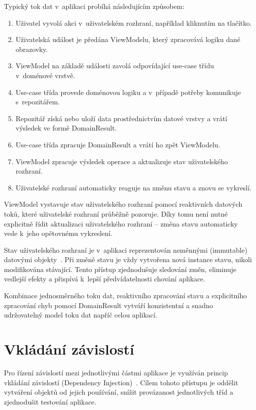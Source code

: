 Typický tok dat v~aplikaci probíhá následujícím způsobem:
\begin{enumerate}
    \item Uživatel vyvolá akci v~uživatelském rozhraní, například kliknutím na tlačítko.
    \item Uživatelská událost je předána ViewModelu, který zpracovává logiku dané obrazovky.
    \item ViewModel na základě události zavolá odpovídající use-case třídu v~doménové vrstvě.
    \item Use-case třída provede doménovou logiku a v~případě potřeby komunikuje s~repozitářem.
    \item Repozitář získá nebo uloží data prostřednictvím datové vrstvy a vrátí výsledek ve formě DomainResult.
    \item Use-case třída zpracuje DomainResult a vrátí ho zpět ViewModelu.
    \item ViewModel zpracuje výsledek operace a aktualizuje stav uživatelského rozhraní.
    \item Uživatelské rozhraní automaticky reaguje na změnu stavu a znovu se vykreslí.
\end{enumerate}

ViewModel vystavuje stav uživatelského rozhraní pomocí reaktivních datových toků, které uživatelské rozhraní průběžně pozoruje.
Díky tomu není nutné explicitně řídit aktualizaci uživatelského rozhraní -- změna stavu automaticky vede k~jeho opětovnému vykreslení.

Stav uživatelského rozhraní je v~aplikaci reprezentován neměnnými (immutable) datovými objekty~\parencite{compose_ui_architecture}.
Při změně stavu je vždy vytvořena nová instance stavu, nikoli modifikována stávající.
Tento přístup zjednodušuje sledování změn, eliminuje vedlejší efekty a přispívá k~lepší předvídatelnosti chování aplikace.

Kombinace jednosměrného toku dat, reaktivního zpracování stavu a explicitního zpracování chyb pomocí DomainResult vytváří konzistentní a snadno udržovatelný model toku dat napříč celou aplikací.


\section{Vkládání závislostí}\label{sec:dependency_injection}
Pro řízení závislostí mezi jednotlivými částmi aplikace je využíván princip vkládání závislostí (Dependency Injection)~\parencite{android_dependency_injection}.
Cílem tohoto přístupu je oddělit vytváření objektů od jejich používání, snížit provázanost jednotlivých tříd a zjednodušit testování aplikace.


